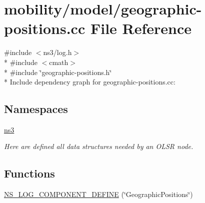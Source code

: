 \hypertarget{geographic-positions_8cc}{}\section{mobility/model/geographic-\/positions.cc File Reference}
\label{geographic-positions_8cc}
{\ttfamily \#include $<$ns3/log.\+h$>$}\\*
{\ttfamily \#include $<$cmath$>$}\\*
{\ttfamily \#include \char`\"{}geographic-\/positions.\+h\char`\"{}}\\*
Include dependency graph for geographic-\/positions.cc\+:
\subsection*{Namespaces}
\begin{DoxyCompactItemize}
\item 
 \hyperlink{namespacens3}{ns3}
\begin{DoxyCompactList}\small\item\em Here are defined all data structures needed by an O\+L\+SR node. \end{DoxyCompactList}\end{DoxyCompactItemize}
\subsection*{Functions}
\begin{DoxyCompactItemize}
\item 
\hyperlink{geographic-positions_8cc_aee1097481dcfdc5f844bcfe8389c02df}{N\+S\+\_\+\+L\+O\+G\+\_\+\+C\+O\+M\+P\+O\+N\+E\+N\+T\+\_\+\+D\+E\+F\+I\+NE} (\char`\"{}Geographic\+Positions\char`\"{})
\end{DoxyCompactItemize}
